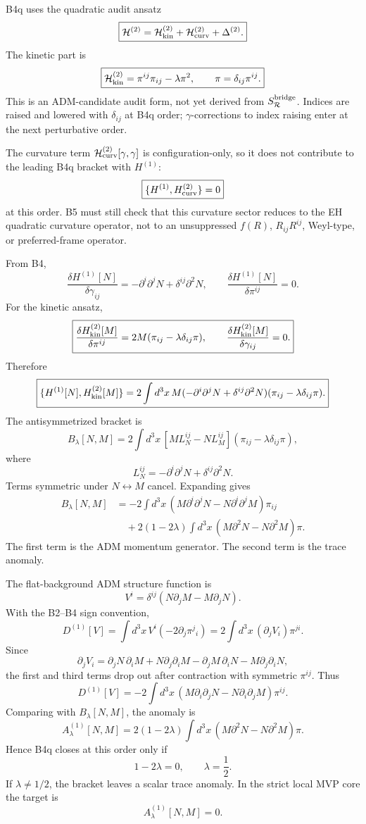 \documentclass[11pt]{article}
\begin{document}
B4q uses the quadratic audit ansatz
\[
\boxed{
{\cal H}^{(2)}
={\cal H}_{\rm kin}^{(2)}
+{\cal H}_{\rm curv}^{(2)}
+\Delta^{(2)}.
}
\]
The kinetic part is
\[
\boxed{
{\cal H}_{\rm kin}^{(2)}
=\pi^{ij}\pi_{ij}-\lambda\pi^2,\qquad
\pi=\delta_{ij}\pi^{ij}.
}
\]
This is an ADM-candidate audit form, not yet derived from
\(S_{\mathcal R}^{\rm bridge}\).  Indices are raised and lowered with
\(\delta_{ij}\) at B4q order; \(\gamma\)-corrections to index raising enter at
the next perturbative order.

The curvature term \({\cal H}_{\rm curv}^{(2)}[\gamma,\gamma]\) is
configuration-only, so it does not contribute to the leading B4q bracket with
\(H^{(1)}\):
\[
\boxed{\{H^{(1)},{H}_{\rm curv}^{(2)}\}=0}
\]
at this order.  B5 must still check that this curvature sector reduces to the
EH quadratic curvature operator, not to an unsuppressed \(f(R)\), \(R_{ij}R^{ij}\),
Weyl-type, or preferred-frame operator.

From B4,
\[
\boxed{
\frac{\delta H^{(1)}[N]}{\delta\gamma_{ij}}
=-\partial^i\partial^jN+\delta^{ij}\partial^2N,\qquad
\frac{\delta H^{(1)}[N]}{\delta\pi^{ij}}=0.
}
\]
For the kinetic ansatz,
\[
\boxed{
\frac{\delta H_{\rm kin}^{(2)}[M]}{\delta\pi^{ij}}
=2M(\pi_{ij}-\lambda\delta_{ij}\pi),\qquad
\frac{\delta H_{\rm kin}^{(2)}[M]}{\delta\gamma_{ij}}=0.
}
\]
Therefore
\[
\boxed{
\{H^{(1)}[N],H_{\rm kin}^{(2)}[M]\}
=2\int d^3x\,M
(-\partial^i\partial^jN+\delta^{ij}\partial^2N)
(\pi_{ij}-\lambda\delta_{ij}\pi).
}
\]
The antisymmetrized bracket is
\[
\boxed{
B_\lambda[N,M]
=2\int d^3x\,[M L_N^{ij}-N L_M^{ij}]
(\pi_{ij}-\lambda\delta_{ij}\pi),
}
\]
where
\[
\boxed{L_N^{ij}=-\partial^i\partial^jN+\delta^{ij}\partial^2N.}
\]
Terms symmetric under \(N\leftrightarrow M\) cancel.  Expanding gives
\[
\boxed{
\begin{aligned}
B_\lambda[N,M]
&=-2\int d^3x\,
(M\partial^i\partial^jN-N\partial^i\partial^jM)\pi_{ij}\\
&\quad
+2(1-2\lambda)\int d^3x\,
(M\partial^2N-N\partial^2M)\pi.
\end{aligned}}
\]
The first term is the ADM momentum generator.  The second term is the trace
anomaly.

The flat-background ADM structure function is
\[
\boxed{V^i=\delta^{ij}(N\partial_jM-M\partial_jN).}
\]
With the B2--B4 sign convention,
\[
\boxed{
D^{(1)}[V]
=\int d^3x\,V^i(-2\partial_j\pi^j{}_i)
=2\int d^3x\,(\partial_jV_i)\pi^{ji}.
}
\]
Since
\[
\partial_jV_i
=\partial_jN\,\partial_iM+N\partial_j\partial_iM
-\partial_jM\,\partial_iN-M\partial_j\partial_iN,
\]
the first and third terms drop out after contraction with symmetric
\(\pi^{ij}\).  Thus
\[
\boxed{
D^{(1)}[V]
=-2\int d^3x\,
(M\partial_i\partial_jN-N\partial_i\partial_jM)\pi^{ij}.
}
\]
Comparing with \(B_\lambda[N,M]\), the anomaly is
\[
\boxed{
A_\lambda^{(1)}[N,M]
=2(1-2\lambda)\int d^3x\,
(M\partial^2N-N\partial^2M)\pi.
}
\]
Hence B4q closes at this order only if
\[
\boxed{1-2\lambda=0,\qquad \lambda=\frac12.}
\]
If \(\lambda\ne1/2\), the bracket leaves a scalar trace anomaly.  In the
strict local MVP core the target is
\[
\boxed{A_\lambda^{(1)}[N,M]=0.}
\]
\end{document}

